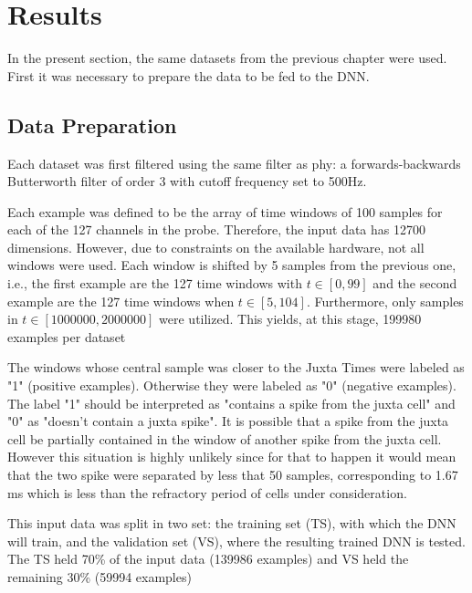 \documentclass{article}
\begin{document}
\section{Results}
\label{sec:DL-results}


In the present section, the same datasets from the previous chapter were used. 
First it was necessary to prepare the data to be fed to the DNN.
\subsection{Data Preparation}
Each dataset was first filtered using the same filter as phy: a forwards-backwards Butterworth filter of order 3 with cutoff frequency set to 500Hz.

Each example was defined to be the array of time windows of 100 samples for each of the 127 channels in the probe. Therefore, the input data has 12700 dimensions. However, due to constraints on the available hardware, not all windows were used. Each window is shifted by 5 samples from the previous one, i.e., the first example are the 127 time windows with $t \in [ 0 , 99]$ and the second example are the 127 time windows when $t \in [ 5, 104]$. Furthermore, only samples in $t \in [1000000,2000000]$ were utilized. This yields, at this stage, 199980 examples per dataset

The windows whose central sample was closer to the Juxta Times were labeled as "1" (positive examples). Otherwise they were labeled as "0" (negative examples). The label "1" should be interpreted as "contains a spike from the juxta cell" and "0" as "doesn't contain a juxta spike". It is possible that a spike from the juxta cell be partially contained in the window of another spike from the juxta cell. However this situation is highly unlikely since for that to happen it would mean that the two spike were separated by less that 50 samples, corresponding to 1.67 ms which is less than the refractory period of cells under consideration.

This input data was split in two set: the training set (TS), with which the DNN will train, and the validation set (VS), where the resulting trained DNN is tested. The TS held 70\% of the input data (139986 examples) and VS held the remaining 30\% (59994 examples)
\end{document}

